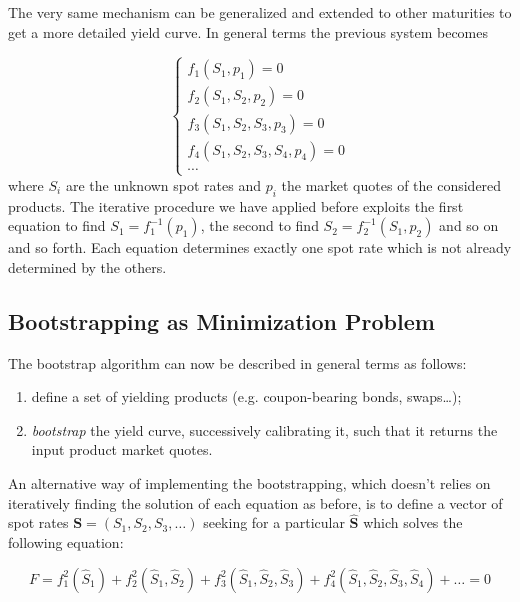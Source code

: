 The very same mechanism can be generalized and extended to other maturities to get a more detailed yield curve. In general terms the previous system becomes

\begin{equation}
\begin{cases}
f_1(S_1, p_1) = 0 \\
f_2(S_1, S_2, p_2) = 0 \\
f_3(S_1, S_2, S_3, p_3) = 0 \\
f_4(S_1, S_2, S_3, S_4, p_4) = 0 \\
\cdots
\end{cases}
\end{equation}
where $S_i$ are the unknown spot rates and $p_i$ the market quotes of the considered products. The iterative procedure we have applied before exploits the first equation to find $S_1 = f_1^{-1}(p_1)$, the second to find $S_2 = f_2^{-1}(S_1, p_2)$ and so on and so forth. Each equation determines exactly one spot rate which is not already determined by the others.

\subsection{Bootstrapping as Minimization Problem}
\label{sec:bootstrap_as_minimization}
The bootstrap algorithm can now be described in general terms as follows:
\begin{enumerate}
\item define a set of yielding products (e.g. coupon-bearing bonds, swaps\ldots);
\item \emph{bootstrap} the yield curve, successively calibrating it, such that it returns the input product market quotes.
\end{enumerate}

An alternative way of implementing the bootstrapping, which doesn't relies on  iteratively finding the solution of each equation as before, is to define a vector of spot rates $\mathbf{S} = (S_1, S_2, S_3, \ldots)$ seeking for a particular $\mathbf{\hat{S}}$ which solves the following equation:

\begin{equation}
F = f_1^2(\hat{S}_1) + f_2^2(\hat{S}_1, \hat{S}_2) + f_3^2(\hat{S}_1, \hat{S}_2, \hat{S}_3) + f_4^2(\hat{S}_1, \hat{S}_2, \hat{S}_3, \hat{S}_4) + \ldots = 0
\end{equation}

